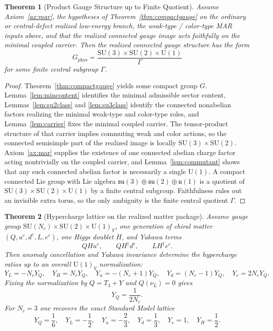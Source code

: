 \documentclass[11pt]{article}
\newtheorem{theorem}{Theorem}[section]
\newcommand{\SU}{\mathrm{SU}}
\newcommand{\U}{\mathrm{U}}
\begin{document}
\begin{theorem}[Product Gauge Structure up to Finite Quotient]\label{thm:sm}
Assume Axiom~\ref{ax:mar}, the hypotheses of Theorem~\ref{thm:compactgauge} on the ordinary or central-defect realized low-energy branch, the weak-type / color-type MAR inputs above, and that the realized connected gauge image acts faithfully on the minimal coupled carrier. Then the realized connected gauge structure has the form
\[
G_{\mathrm{phys}}=
\frac{\SU(3)\times\SU(2)\times\U(1)}{\Gamma}
\]
for some finite central subgroup $\Gamma$.
\end{theorem}

\begin{proof}
Theorem~\ref{thm:compactgauge} yields some compact group $G$. Lemma~\ref{lem:mincontent} identifies the minimal admissible sector content, Lemmas~\ref{lem:su2class} and \ref{lem:su3class} identify the connected nonabelian factors realizing the minimal weak-type and color-type roles, and Lemma~\ref{lem:carrier} fixes the minimal coupled carrier. The tensor-product structure of that carrier implies commuting weak and color actions, so the connected semisimple part of the realized image is locally $\SU(3)\times\SU(2)$. Axiom~\ref{ax:mar} supplies the existence of one connected abelian charge factor acting nontrivially on the coupled carrier, and Lemma~\ref{lem:commutant} shows that any such connected abelian factor is necessarily a single $\U(1)$. A compact connected Lie group with Lie algebra $\mathfrak{su}(3)\oplus\mathfrak{su}(2)\oplus\mathfrak{u}(1)$ is a quotient of $\SU(3)\times\SU(2)\times\U(1)$ by a finite central subgroup. Faithfulness rules out an invisible extra torus, so the only ambiguity is the finite central quotient $\Gamma$.
\end{proof}

\begin{theorem}[Hypercharge lattice on the realized matter package]\label{thm:hypercharge}
Assume gauge group $\SU(N_c)\times\SU(2)\times\U(1)_Y$, one generation of chiral matter $(Q,u^c,d^c,L,e^c)$, one Higgs doublet $H$, and Yukawa terms
\[
QHu^c,\qquad QH^\dagger d^c,\qquad LH^\dagger e^c.
\]
Then anomaly cancellation and Yukawa invariance determine the hypercharge ratios up to an overall \(\U(1)_Y\) normalization:
\[
Y_L=-N_cY_Q,\quad
Y_H=N_cY_Q,\quad
Y_u=-(N_c+1)Y_Q,\quad
Y_d=(N_c-1)Y_Q,\quad
Y_e=2N_cY_Q.
\]
Fixing the normalization by $Q=T_3+Y$ and $Q(\nu_L)=0$ gives
\[
Y_Q=\frac{1}{2N_c}.
\]
For $N_c=3$ one recovers the exact Standard Model lattice
\[
Y_Q=\frac16,\quad
Y_L=-\frac12,\quad
Y_u=-\frac23,\quad
Y_d=\frac13,\quad
Y_e=1,\quad
Y_H=\frac12.
\]
\end{theorem}
\end{document}
